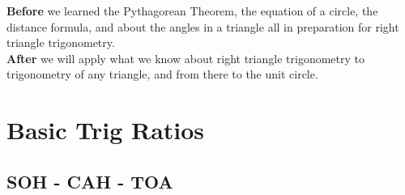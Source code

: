 \documentclass[12pt]{article}
\begin{document}
\textbf{Before} we learned the Pythagorean Theorem, the equation of a circle, the distance formula, and about the angles in a triangle all in preparation for right triangle trigonometry.\\


\textbf{After} we will apply what we know about right triangle trigonometry to trigonometry of any triangle, and from there to the unit circle.\\


\let\stdsection\section
\renewcommand\section{\newpage\stdsection}

\section*{Basic Trig Ratios} %

\subsection*{SOH - CAH - TOA}

\begin{center}
\end{center}
\end{document}
